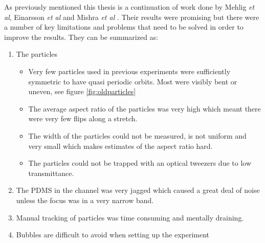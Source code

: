 As previously mentioned this thesis is a continuation of work done by Mehlig \emph{et al}, Einarsson \emph{et al} and Mishra \emph{et al} \cite{AntonThesis, JonasExperiment, Mishra}. Their results were promising but there were a number of key limitations and problems that need to be solved in order to improve the results. They can be summarized as:
\begin{enumerate} \label{list:problems}
	\item The particles 
	\begin{itemize}
		\item Very few particles used in previous experiments were sufficiently symmetric to have quasi periodic orbits. Most were visibly bent or uneven, see figure \ref{fig:oldparticles}
		\item The average aspect ratio of the particles was very high which meant there were very few flips along a stretch.
		\item The width of the particles could not be measured, is not uniform and very small which makes estimates of the aspect ratio hard.
		\item The particles could not be trapped with an optical tweezers due to low transmittance.
	\end{itemize}
	\item The PDMS in the channel was very jagged which caused a great deal 
			of noise unless the focus was in a very narrow band.
	\item Manual tracking of particles was time consuming and mentally draining.
	\item Bubbles are difficult to avoid when setting up the experiment
\end{enumerate}

